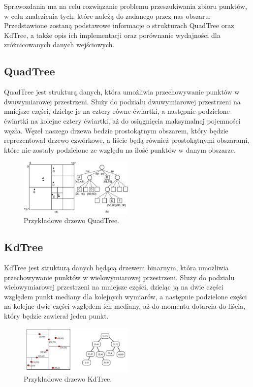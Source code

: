 \documentclass{lab}
\begin{document}
Sprawozdania ma na celu rozwiązanie problemu przeszukiwania zbioru punktów, w celu znalezienia tych, które należą do zadanego przez nas obszaru. 
Przedstawione zostaną podstawowe informacje o strukturach QuadTree oraz KdTree, a także opis ich implementacji oraz porównanie wydajności dla zróżnicowanych danych wejściowych.

\subsection{QuadTree}
QuadTree jest strukturą danych, która umożliwia przechowywanie punktów w dwuwymiarowej przestrzeni. 
Służy do podziału dwuwymiarowej przestrzeni na mniejsze części, dzieląc je na cztery równe ćwiartki, a następnie podzielone ćwiartki na kolejne cztery ćwiartki, aż do osiągnięcia maksymalnej pojemności węzła.
Węzeł naszego drzewa bedzie prostokątnym obszarem, który będzie reprezentował drzewo czwórkowe, a liście będą również prostokątnymi obszarami, które nie zostały podzielone ze względu na ilość punktów w danym obszarze.
\begin{figure}[H]
  \centering
  \includegraphics[width=0.5\textwidth]{resources/quadtree.png}
  \caption{Przykładowe drzewo QuadTree.}
  \label{fig:quadtree}
\end{figure}

\subsection{KdTree}
KdTree jest strukturą danych będącą drzewem binarnym, która umożliwia przechowywanie punktów w wielowymiarowej przestrzeni.
Służy do podziału wielowymiarowej przestrzeni na mniejsze części, dzieląc ją na dwie części względem punkt mediany dla kolejnych wymiarów, 
a następnie podzielone części na kolejne dwie części względem ich mediany, aż do momentu dotarcia do liścia, który będzie zawierał jeden punkt.
\begin{figure}[H]
  \centering
  \includegraphics[width=0.5\textwidth]{resources/kdtree.jpg}
  \caption{Przykładowe drzewo KdTree.}
  \label{fig:kdtree}
\end{figure}
\end{document}
